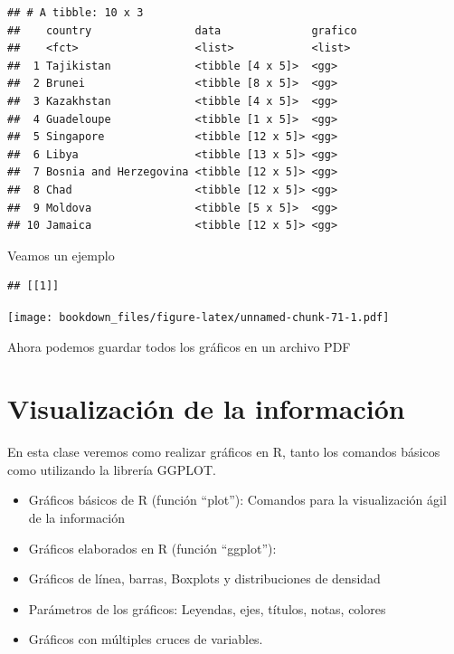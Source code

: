 \documentclass[]{book}
\newenvironment{Shaded}{\begin{snugshade}}{\end{snugshade}}
\newcommand{\DecValTok}[1]{\textcolor[rgb]{0.00,0.00,0.81}{#1}}
\newcommand{\KeywordTok}[1]{\textcolor[rgb]{0.13,0.29,0.53}{\textbf{#1}}}
\newcommand{\NormalTok}[1]{#1}
\newcommand{\OperatorTok}[1]{\textcolor[rgb]{0.81,0.36,0.00}{\textbf{#1}}}
\newcommand{\StringTok}[1]{\textcolor[rgb]{0.31,0.60,0.02}{#1}}
\providecommand{\tightlist}{%
  \setlength{\itemsep}{0pt}\setlength{\parskip}{0pt}}
\begin{document}
\begin{verbatim}
## # A tibble: 10 x 3
##    country                data              grafico
##    <fct>                  <list>            <list> 
##  1 Tajikistan             <tibble [4 x 5]>  <gg>   
##  2 Brunei                 <tibble [8 x 5]>  <gg>   
##  3 Kazakhstan             <tibble [4 x 5]>  <gg>   
##  4 Guadeloupe             <tibble [1 x 5]>  <gg>   
##  5 Singapore              <tibble [12 x 5]> <gg>   
##  6 Libya                  <tibble [13 x 5]> <gg>   
##  7 Bosnia and Herzegovina <tibble [12 x 5]> <gg>   
##  8 Chad                   <tibble [12 x 5]> <gg>   
##  9 Moldova                <tibble [5 x 5]>  <gg>   
## 10 Jamaica                <tibble [12 x 5]> <gg>
\end{verbatim}

Veamos un ejemplo

\begin{Shaded}
\end{Shaded}

\begin{verbatim}
## [[1]]
\end{verbatim}

\texttt{[image: bookdown\_files/figure-latex/unnamed-chunk-71-1.pdf]}

Ahora podemos guardar todos los gráficos en un archivo PDF

\begin{Shaded}
\end{Shaded}

\hypertarget{visualizacion-de-la-informacion}{%
\chapter{Visualización de la información}\label{visualizacion-de-la-informacion}}

En esta clase veremos como realizar gráficos en R, tanto los comandos básicos como utilizando la librería GGPLOT.

\begin{itemize}
\tightlist
\item
  Gráficos básicos de R (función ``plot''): Comandos para la visualización ágil de la información
\item
  Gráficos elaborados en R (función ``ggplot''):
\item
  Gráficos de línea, barras, Boxplots y distribuciones de densidad
\item
  Parámetros de los gráficos: Leyendas, ejes, títulos, notas, colores
\item
  Gráficos con múltiples cruces de variables.
\end{itemize}
\end{document}
